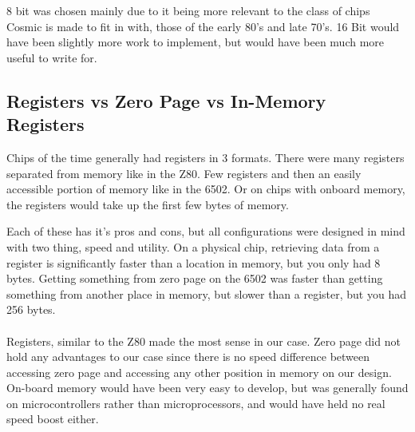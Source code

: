 \documentclass[conference]{IEEEtran}
\begin{document}
8 bit was chosen mainly due to it being more relevant to the class of chips Cosmic is made to fit in with, those of the early 80's and late 70's. 16 Bit would have been slightly more work to implement, but would have been much more useful to write for.

\subsection{Registers vs Zero Page vs In-Memory Registers}

Chips of the time generally had registers in 3 formats. There were many registers separated from memory like in the Z80. Few registers and then an easily accessible portion of memory like in the 6502. Or on chips with onboard memory, the registers would take up the first few bytes of memory.

Each of these has it's pros and cons, but all configurations were designed in mind with two thing, speed and utility. On a physical chip, retrieving data from a register is significantly faster than a location in memory, but you only had 8 bytes. Getting something from zero page on the 6502 was faster than getting something from another place in memory, but slower than a register, but you had 256 bytes.\\

\\
Registers, similar to the Z80 made the most sense in our case. Zero page did not hold any advantages to our case since there is no speed difference between accessing zero page and accessing any other position in memory on our design. On-board memory would have been very easy to develop, but was generally found on microcontrollers rather than microprocessors, and would have held no real speed boost either.
\end{document}
